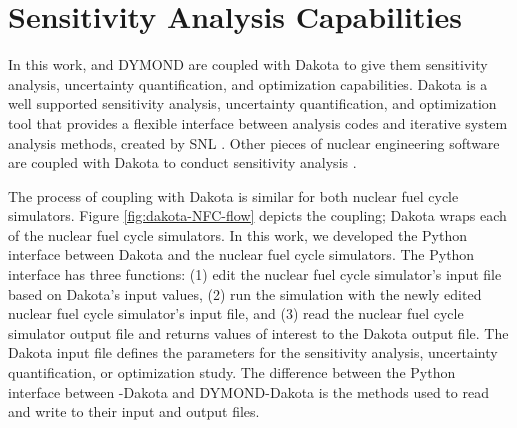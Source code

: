 \section{Sensitivity Analysis Capabilities}
In this work, \Cyclus and DYMOND are coupled with Dakota 
\cite{eldred_dakota_2010} to give them
sensitivity analysis, 
uncertainty quantification, and optimization capabilities. 
Dakota is a well supported sensitivity analysis, uncertainty quantification, 
and optimization tool that provides a flexible interface between 
analysis codes and iterative system analysis methods, created by \gls{SNL} 
\cite{turner_virtual_nodate}. 
Other pieces of nuclear engineering software are coupled with 
Dakota to conduct sensitivity analysis
\cite{turner_virtual_nodate,zhang_uncertainty_nodate}. 

The process of coupling with Dakota is similar 
for both nuclear fuel cycle simulators. 
Figure \ref{fig:dakota-NFC-flow} depicts the coupling; 
Dakota wraps each of the nuclear fuel cycle simulators.
In this work, we developed the Python interface between 
Dakota and the nuclear fuel cycle simulators.
The Python interface has three functions: 
(1) edit the nuclear fuel cycle simulator's input file based on Dakota's input values, 
(2) run the simulation with the newly edited nuclear fuel cycle simulator's input file, and 
(3) read the nuclear fuel cycle simulator output file and returns values of interest 
to the Dakota output file. 
The Dakota input file defines the parameters for the sensitivity analysis, 
uncertainty quantification, or optimization study.
The difference between the Python interface between \Cyclus-Dakota and DYMOND-Dakota 
is the methods used to read and write to their input and output files. 

